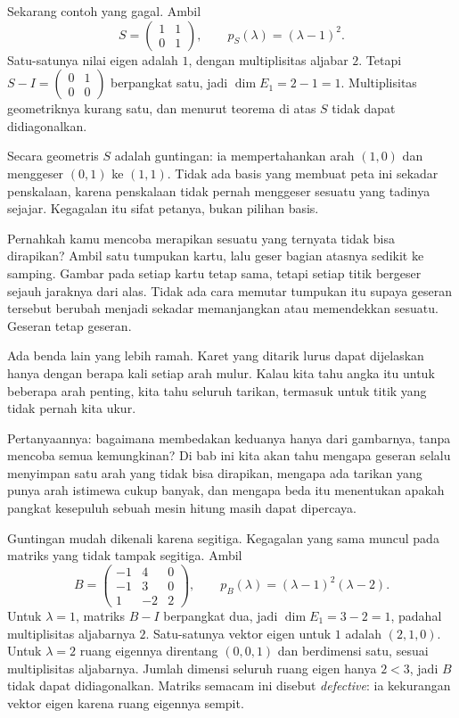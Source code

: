 Sekarang contoh yang gagal. Ambil
\[
  S=\begin{pmatrix}1&1\\ 0&1\end{pmatrix},\qquad p_{S}(\lambda)=(\lambda-1)^{2}.
\]
Satu-satunya nilai eigen adalah $1$, dengan multiplisitas aljabar $2$. Tetapi
$S-I=\begin{pmatrix}0&1\\ 0&0\end{pmatrix}$ berpangkat satu, jadi
$\dim E_{1}=2-1=1$. Multiplisitas geometriknya kurang satu, dan menurut teorema di atas $S$ tidak
dapat didiagonalkan.

Secara geometris $S$ adalah guntingan: ia mempertahankan arah $(1,0)$ dan menggeser $(0,1)$ ke
$(1,1)$. Tidak ada basis yang membuat peta ini sekadar penskalaan, karena penskalaan tidak pernah
menggeser sesuatu yang tadinya sejajar. Kegagalan itu sifat petanya, bukan pilihan basis.

\begin{untukanak}
Pernahkah kamu mencoba merapikan sesuatu yang ternyata tidak bisa dirapikan? Ambil satu tumpukan
kartu, lalu geser bagian atasnya sedikit ke samping. Gambar pada setiap kartu tetap sama, tetapi
setiap titik bergeser sejauh jaraknya dari alas. Tidak ada cara memutar tumpukan itu supaya
geseran tersebut berubah menjadi sekadar memanjangkan atau memendekkan sesuatu. Geseran tetap
geseran.

Ada benda lain yang lebih ramah. Karet yang ditarik lurus dapat dijelaskan hanya dengan berapa
kali setiap arah mulur. Kalau kita tahu angka itu untuk beberapa arah penting, kita tahu seluruh
tarikan, termasuk untuk titik yang tidak pernah kita ukur.

Pertanyaannya: bagaimana membedakan keduanya hanya dari gambarnya, tanpa mencoba semua
kemungkinan? Di bab ini kita akan tahu mengapa geseran selalu menyimpan satu arah yang tidak bisa
dirapikan, mengapa ada tarikan yang punya arah istimewa cukup banyak, dan mengapa beda itu
menentukan apakah pangkat kesepuluh sebuah mesin hitung masih dapat dipercaya.
\end{untukanak}

Guntingan mudah dikenali karena segitiga. Kegagalan yang sama muncul pada matriks yang tidak tampak
segitiga. Ambil
\[
  B=\begin{pmatrix}-1&4&0\\ -1&3&0\\ 1&-2&2\end{pmatrix},\qquad
  p_{B}(\lambda)=(\lambda-1)^{2}(\lambda-2).
\]
Untuk $\lambda=1$, matriks $B-I$ berpangkat dua, jadi $\dim E_{1}=3-2=1$, padahal
multiplisitas aljabarnya $2$. Satu-satunya vektor eigen untuk $1$ adalah $(2,1,0)$. Untuk
$\lambda=2$ ruang eigennya direntang $(0,0,1)$ dan berdimensi satu, sesuai multiplisitas
aljabarnya. Jumlah dimensi seluruh ruang eigen hanya $2<3$, jadi $B$ tidak dapat didiagonalkan.
Matriks semacam ini disebut \emph{defective}: ia kekurangan vektor eigen karena ruang eigennya
sempit.

